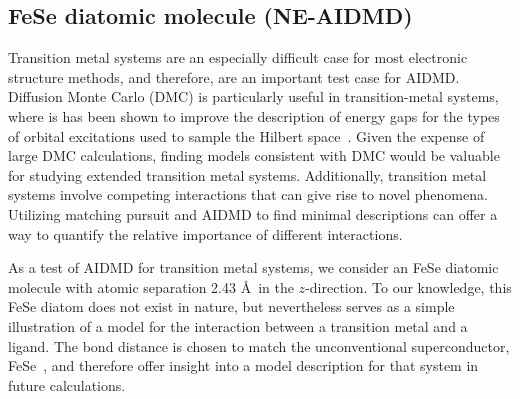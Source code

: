 \subsection{FeSe diatomic molecule (NE-AIDMD)}
\label{subsection:fese}
Transition metal systems are an especially difficult case for most electronic structure methods, and therefore, are an 
important test case for AIDMD. 
Diffusion Monte Carlo (DMC) is particularly useful in transition-metal systems, where is has been shown to improve the description of energy gaps for the types of orbital excitations used to sample the Hilbert space~\cite{lucas}.
Given the expense of large DMC calculations, finding models consistent with DMC would be valuable for studying extended transition metal systems. Additionally, transition metal systems involve competing interactions that can give rise to novel phenomena. 
Utilizing matching pursuit and AIDMD to find minimal descriptions can offer a way to quantify the relative importance of different interactions.

As a test of AIDMD for transition metal systems, we consider an FeSe diatomic molecule with atomic separation 2.43 \AA~in the $z$-direction.
To our knowledge, this FeSe diatom does not exist in nature, but nevertheless serves as a simple illustration of a model for the interaction between a transition metal and a ligand. The bond distance is chosen to match the unconventional superconductor, FeSe~\cite{fese}, and therefore offer insight into a model description for that system in future calculations.

